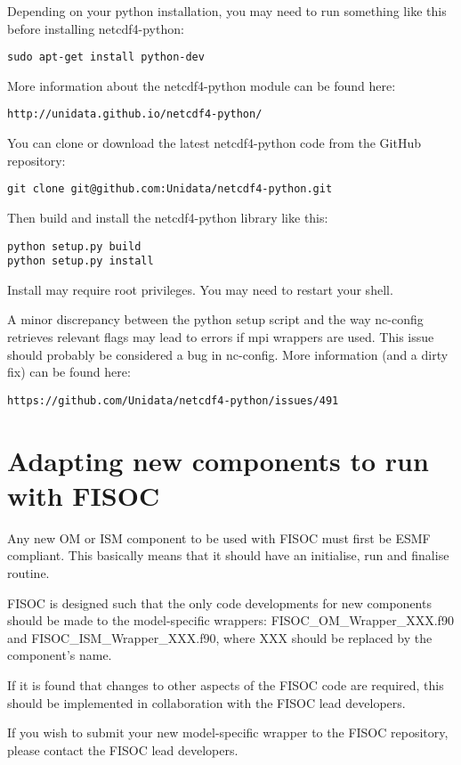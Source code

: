 \documentclass[12pt]{article}
\begin{document}
Depending on your python installation, you may need to run something like this
before installing netcdf4-python:
\begin{lstlisting}
sudo apt-get install python-dev
\end{lstlisting}
More information about the netcdf4-python module can be found here:
\begin{lstlisting}
http://unidata.github.io/netcdf4-python/
\end{lstlisting}
You can clone or download the latest netcdf4-python code from the GitHub 
repository:
\begin{lstlisting}
git clone git@github.com:Unidata/netcdf4-python.git 
\end{lstlisting}
Then build and install the netcdf4-python library like this:
\begin{lstlisting}
python setup.py build
python setup.py install
\end{lstlisting}
Install may require root privileges.
You may need to restart your shell.  

A minor discrepancy between the python setup script and the way nc-config 
retrieves relevant flags may lead to errors if mpi wrappers are used. 
This issue should probably be considered a bug in nc-config. 
More information (and a dirty fix) can be found here:
\begin{lstlisting}
https://github.com/Unidata/netcdf4-python/issues/491
\end{lstlisting}






\section{Adapting new components to run with  FISOC}
\label{sec:FISOC_SDG}

Any new OM or ISM component to be used with FISOC must first be ESMF compliant.  This basically 
means that it should have an initialise, run and finalise routine. 

FISOC is designed such that the only code developments for new components should be made to the 
model-specific wrappers: FISOC\_OM\_Wrapper\_XXX.f90 and FISOC\_ISM\_Wrapper\_XXX.f90, where 
XXX should be replaced by the component's name.

If it is found that changes to other aspects of the FISOC code are required, this should be 
implemented in collaboration with the FISOC lead developers.

If you wish to submit your new model-specific wrapper to the FISOC repository, please contact 
the FISOC lead developers.
\end{document}
